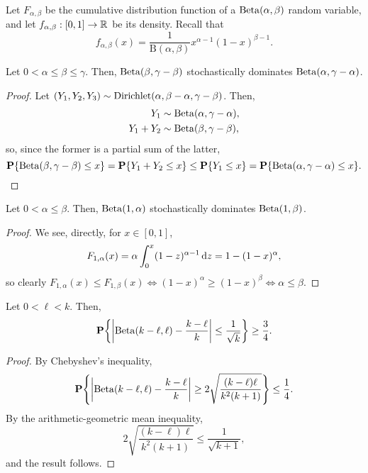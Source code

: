 Let $F_{\alpha, \beta}$ be the cumulative distribution function of a
$\operatorname{Beta}(\alpha, \beta)$ random variable, and let
$f_{\alpha, \beta} : [0, 1] \to \mathbb{R}$ be its density. Recall that
\[
  f_{\alpha, \beta}(x) = \frac{1}{\mathrm{B}(\alpha, \beta)} x^{\alpha - 1} (1 - x)^{\beta - 1} .
\]
\begin{lem}
  Let $0 < \alpha \le \beta \le \gamma$. Then,
  $\operatorname{Beta}(\beta, \gamma - \beta)$ stochastically dominates
  $\operatorname{Beta}(\alpha, \gamma - \alpha)$.
\end{lem}
\begin{proof}
  Let
  $(Y_1, Y_2, Y_3) \sim \operatorname{Dirichlet}(\alpha, \beta - \alpha, \gamma -
  \beta)$. Then,
  \begin{align*}
    Y_1 &\sim \operatorname{Beta}(\alpha, \gamma - \alpha) , \\
    Y_1 + Y_2 &\sim \operatorname{Beta}(\beta, \gamma - \beta) ,
  \end{align*}
  so, since the former is a partial sum of the latter,
  \[
    \operatorname{\mathbf{P}}\{\operatorname{Beta}(\beta, \gamma - \beta) \le x\} = \operatorname{\mathbf{P}}\{ Y_1 + Y_2 \le x\} \le \operatorname{\mathbf{P}}\{ Y_1 \le x\} = \operatorname{\mathbf{P}}\{\operatorname{Beta}(\alpha, \gamma - \alpha) \le x\} . \qedhere
  \]
\end{proof}

\begin{lem}
  Let $0 < \alpha \le \beta$. Then, $\operatorname{Beta}(1,
  \alpha)$ stochastically dominates $\operatorname{Beta}(1, \beta)$.
\end{lem}
\begin{proof}
  We see, directly, for $x \in [0, 1]$,
  \[
    F_{1, \alpha}(x) = \alpha \int_0^x (1 - z)^{\alpha - 1} \mathop{}\!\mathrm{d} z = 1 - (1 - x)^\alpha ,
  \]
  so clearly
  $F_{1, \alpha}(x) \le F_{1, \beta}(x) \iff (1 - x)^\alpha \ge (1 -
  x)^\beta \iff \alpha \le \beta$.
\end{proof}

\begin{lem}
  Let $0 < \ell < k$. Then,
  \[
    \Pr\left\{\left|\Beta(k - \ell, \ell) - \frac{k - \ell}{k}\right| \le \frac{1}{\sqrt{k}} \right\} \ge \frac{3}{4} .
  \]
\end{lem}
\begin{proof}
  By Chebyshev's inequality,
  \[
    \Pr\left\{\left|\Beta(k - \ell, \ell) - \frac{k - \ell}{k}\right| \ge 2 \sqrt{\frac{(k - \ell) \ell}{k^2 (k + 1)}}\right\} \le \frac{1}{4} .
  \]
  By the arithmetic-geometric mean inequality,
  \[
    2 \sqrt{\frac{(k - \ell) \ell}{k^2 (k + 1)}} \le \frac{1}{\sqrt{k + 1}} ,
  \]
  and the result follows.
\end{proof}
